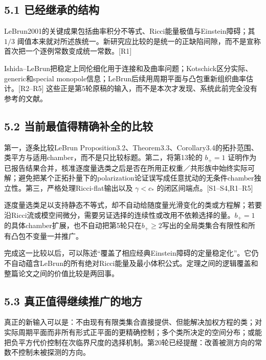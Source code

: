 \documentclass[
  11pt,
  a4paper,
  fontset=none]{ctexart}
\begin{document}
\subsection{5.1
已经继承的结构}\label{ux5df2ux7ecfux7ee7ux627fux7684ux7ed3ux6784}

LeBrun2001的关键成果包括曲率积分不等式、Ricci能量极值与Einstein障碍；其
\(1/3\)
阈值本来就对所述族统一。新研究应比较的是统一的正缺陷间隙，而不是宣称首次把一个逐例常数变成统一常数。{[}R1{]}

Ishida--LeBrun把稳定上同伦细化用于连接和及曲率问题；Kotschick区分实际、generic和special
monopole信息；LeBrun后续用周期平面与凸包重新组织曲率估计。{[}R2--R5{]}
这些正是第5轮原稿的输入，而不是本次才发现、系统此前完全没有参考的文献。

\subsection{5.2
当前最值得精确补全的比较}\label{ux5f53ux524dux6700ux503cux5f97ux7cbeux786eux8865ux5168ux7684ux6bd4ux8f83}

第一，逐条比较LeBrun
Proposition3.2、Theorem3.3、Corollary3.4的拓扑范围、类平方与适用chamber，而不是只比较标题。第二，将第13轮的
\(b_+=1\)
证明作为已报告结果合并，核准逐度量选类之后是否在所用正权重／共形族中始终实际可解；避免把某个正拓扑量下的polarization论证误写成任意扰动的无条件chamber独立性。第三，严格处理Ricci-flat输出以及
\(\gamma<c_*\) 的闭区间端点。{[}S1--S4,R1--R5{]}

逐度量选类足以支持静态不等式，却不自动给随度量光滑变化的类或方程解；若要沿Ricci流或模空间微分，需要另证选择的连续性或改用不依赖选择的量。\(b_+=1\)的具体chamber扩展，也不自动把第5轮只在\(b_+\ge2\)写出的全局类集合有限性和所有凸包不变量一并推广。

完成这一比较以后，可以陈述``覆盖了相应经典Einstein障碍的定量稳定化''。它仍不自动蕴含LeBrun的所有绝对Ricci能量及最小体积公式。定理之间的逻辑覆盖和整篇论文之间的价值比较是两回事。

\subsection{5.3
真正值得继续推广的地方}\label{ux771fux6b63ux503cux5f97ux7ee7ux7eedux63a8ux5e7fux7684ux5730ux65b9}

真正的新输入可以是：不由现有有限类集合直接提供、但能解决加权方程的类；对实际周期平面而非所有形式正平面的更精确控制；多个类所决定的空间分布；或能把负平方代价控制在次临界尺度的选择机制。第20轮已经提醒：改善被测方向的常数不控制未被探测的方向。
\end{document}
